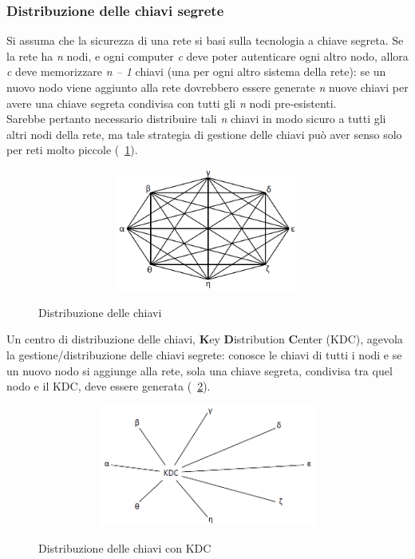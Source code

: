 \subsubsection{Distribuzione delle chiavi segrete}
Si assuma che la sicurezza di una rete si basi sulla tecnologia a chiave segreta. Se la rete ha \textit{n} nodi, e
ogni computer \textit{c} deve poter autenticare ogni altro nodo, allora \textit{c} deve memorizzare \textit{n – 1} chiavi (una per ogni altro sistema della rete): se un nuovo nodo viene aggiunto alla rete dovrebbero essere generate \textit{n} nuove chiavi per avere una chiave segreta condivisa con tutti gli \textit{n} nodi pre-esistenti. \\
Sarebbe pertanto necessario distribuire tali \textit{n} chiavi in modo sicuro a tutti gli altri nodi della rete, ma tale strategia di gestione delle chiavi può aver senso solo per reti molto piccole (\figurename~\ref{fig:ImgS50}). 
\begin{figure}[htbp]
	\centering%
	\subfigure%
	{\includegraphics[height=4cm, width=12cm, keepaspectratio]{Immagini/autenticazione/ImgS50.png}}
	\caption{Distribuzione delle chiavi\label{fig:ImgS50}} 	
\end{figure}
Un centro di distribuzione delle chiavi, \textbf{K}ey \textbf{D}istribution \textbf{C}enter (KDC), agevola la gestione/distribuzione delle chiavi segrete: conosce le chiavi di tutti i nodi e se un nuovo nodo si aggiunge alla rete, sola una chiave segreta, condivisa tra quel nodo e il KDC, deve essere generata (\figurename~\ref{fig:ImgS52}). 
\begin{figure}[htbp]
	\centering%
	\subfigure%
	{\includegraphics[height=4cm, width=12cm, keepaspectratio]{Immagini/autenticazione/ImgS52.png}}
	\caption{Distribuzione delle chiavi con KDC\label{fig:ImgS52}} 	
\end{figure}


